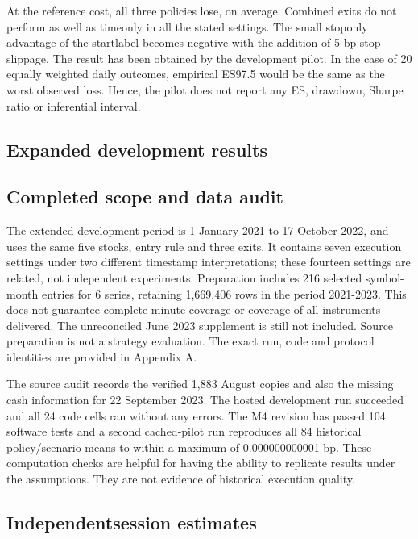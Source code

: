 \documentclass[11pt,a4paper]{article}
\begin{document}
At the reference cost, all three policies lose, on average. Combined exits do not perform as well as time\allowbreak{}only in all the stated settings. The small stop\allowbreak{}only advantage of the start\allowbreak{}label becomes negative with the addition of 5 bp stop slippage. The result has been obtained by the development pilot. In the case of 20 equally weighted daily outcomes, empirical ES97.5 would be the same as the worst observed loss. Hence, the pilot does not report any ES, drawdown, Sharpe ratio or inferential interval.

\subsection*{Expanded development results}

\subsection*{Completed scope and data audit}

The extended development period is 1 January 2021 to 17 October 2022, and uses the same five stocks, entry rule and three exits. It contains seven execution settings under two different timestamp interpretations; these fourteen settings are related, not independent experiments. Preparation includes 216 selected symbol-month entries for 6 series, retaining 1,669,406 rows in the period 2021-2023. This does not guarantee complete minute coverage or coverage of all instruments delivered. The unreconciled June 2023 supplement is still not included. Source preparation is not a strategy evaluation. The exact run, code and protocol identities are provided in Appendix A.

The source audit records the verified 1,883 August copies and also the missing cash information for 22 September 2023. The hosted development run succeeded and all 24 code cells ran without any errors. The M4 revision has passed 104 software tests and a second cached-pilot run reproduces all 84 historical policy/scenario means to within a maximum of 0.000000000001 bp. These computation checks are helpful for having the ability to replicate results under the assumptions. They are not evidence of historical execution quality.

\subsection*{Independent\allowbreak{}session estimates}
\end{document}
